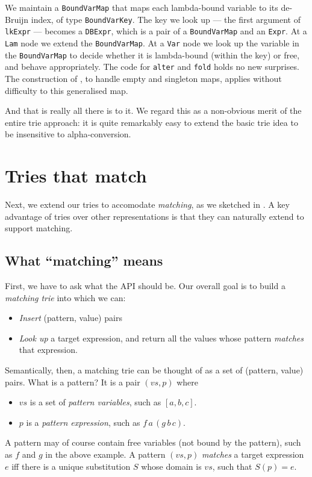 \documentclass[acmsmall]{acmart}
\theoremstyle{theorem}
\theoremstyle{definition}
\theoremstyle{remark}
\begin{document}
We maintain a \lstinline{BoundVarMap}
that maps each lambda-bound variable to its de-Bruijn index, of type \lstinline{BoundVarKey}.  The key
we look up --- the first argument of \lstinline{lkExpr} --- becomes a \lstinline{DBExpr},
which is a pair of a \lstinline{BoundVarMap} and an \lstinline{Expr}.
At a \lstinline{Lam}
node we extend the \lstinline{BoundVarMap}. At a \lstinline{Var} node we
look up the variable in the \lstinline{BoundVarMap} to decide whether it is
lambda-bound (within the key) or free, and behave appropriately.
The code for \lstinline{alter} and \lstinline{fold} holds no new surprises.
The construction of , to handle empty and singleton maps,
applies without difficulty to this generalised map.

And that is really all there is to it.  We regard this as a non-obvious merit
of the entire trie approach: it is quite remarkably easy to extend the basic
trie idea to be insensitive to alpha-conversion.

\section{Tries that match}

Next, we extend our tries to accomodate \emph{matching}, as we
sketched in .  A key advantage of tries over other representations is
that they can naturally extend to support matching.

\subsection{What ``matching'' means} \label{sec:matching-spec}

First, we have to ask what the API should be.
Our overall goal is to build a \emph{matching trie} into which we can:
\begin{itemize}
\item \emph{Insert} (pattern, value) pairs
\item \emph{Look up} a target expression, and return all the values whose pattern \emph{matches} that expression.
\end{itemize}
Semantically, then, a matching trie can be thought of as a set of (pattern, value) pairs.
What is a pattern? It is a pair $(vs,p)$ where
\begin{itemize}
\item $vs$ is a set of \emph{pattern variables}, such as $[a,b,c]$.
\item $p$ is a \emph{pattern expression}, such as $f\, a\, (g\, b\, c)$.
\end{itemize}
A pattern may of course contain free variables (not bound by the pattern), such as $f$ and $g$
in the above example.
A pattern $(vs, p)$ \emph{matches} a target expression $e$ iff there is a unique substitution
$S$ whose domain is $vs$, such that $S(p) = e$.
\end{document}
